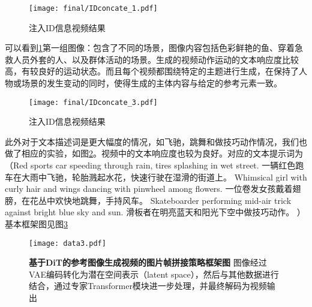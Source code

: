\begin{figure}[htbp]
    \centering
    \texttt{[image: final/IDconcate\_1.pdf]}
    \caption{\textbf{}
    注入ID信息视频结果
    }
    \label{IDconcate_1}
\end{figure}
可以看到\ref{IDconcate_1}第一组图像：包含了不同的场景，图像内容包括色彩鲜艳的鱼、穿着急救人员外套的人、以及群体活动的场景。生成的视频动作运动的文本响应度比较高，有较良好的运动状态。而且每个视频都围绕特定的主题进行生成，在保持了人物或场景的发生变动的同时，使得生成的主体内容与给定的参考元素一致。

\begin{figure}[htbp]
    \centering
    \texttt{[image: final/IDconcate\_3.pdf]}
    \caption{\textbf{}
    注入ID信息视频结果
    }
    \label{IDconcate_3}
\end{figure}
此外对于文本描述词是更大幅度的情况，如飞驰，跳舞和做技巧动作情况，我们也做了相应的实验，如图\ref{IDconcate_3}。视频中的文本响应度也较为良好。对应的文本提示词为（Red sports car speeding through rain, tires splashing in wet street.
一辆红色跑车在大雨中飞驰，轮胎溅起水花，快速行驶在湿滑的街道上。
Whimsical girl with curly hair and wings dancing with pinwheel among flowers.
一位卷发女孩戴着翅膀，在花丛中欢快地跳舞，手持风车。
Skateboarder performing mid-air trick against bright blue sky and sun.
滑板者在明亮蓝天和阳光下空中做技巧动作。
）
基本框架图见图\ref{architecture}
\begin{figure}[htbp]
    \centering
    \texttt{[image: data3.pdf]}
    \caption{\textbf{基于DiT的参考图像生成视频的图片帧拼接策略框架图}
        图像经过VAE编码转化为潜在空间表示（latent space），然后与其他数据进行结合，通过专家Transformer模块进一步处理，并最终解码为视频输出
    }
    \label{architecture}
\end{figure}

